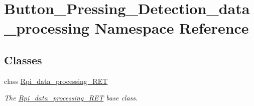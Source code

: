 \hypertarget{a00021}{}\section{Button\+\_\+\+Pressing\+\_\+\+Detection\+\_\+data\+\_\+processing Namespace Reference}
\label{a00021}
\subsection*{Classes}
\begin{DoxyCompactItemize}
\item 
class \hyperlink{a00033}{Rpi\+\_\+data\+\_\+processing\+\_\+\+R\+ET}
\begin{DoxyCompactList}\small\item\em The \hyperlink{a00033}{Rpi\+\_\+data\+\_\+processing\+\_\+\+R\+ET} base class. \end{DoxyCompactList}\end{DoxyCompactItemize}
